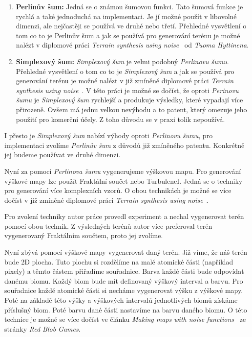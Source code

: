 \begin{enumerate}
    \item \textbf{Perlinův šum:} Jedná se o známou šumovou funkci. Tato šumová funkce je rychlá a také jednoduchá na implementaci. Je jí možné použít v libovolné dimenzi, ale nejčastěji se používá ve druhé nebo třetí. Přehledné vysvětlení o tom co to je Perlinův šum a jak se používá pro generování terénu je možné nalézt v diplomové práci \textit{Terrain synthesis using noise}~\cite{TerrainNoise} od \textit{Tuoma Hyttinena}.

    \item \textbf{Simplexový šum:} \textit{Simplexový šum} je velmi podobný \textit{Perlinovu šumu}. Přehledné vysvětlení o tom co to je \textit{Simplexový šum} a jak se používá pro generování terénu je možné nalézt v již zmíněné diplomové práci \textit{Terrain synthesis using noise}~\cite{TerrainNoise}. V této práci je možné se dočíst, že oproti \textit{Perinovu šumu} je \textit{Simplexový šum} rychlejší a produkuje výsledky, které vypadají více přirozeně. Ovšem má jednu velkou nevýhodu a to patent, který omezuje jeho použití pro komerční účely. Z toho důvodu se v praxi tolik nepoužívá.
\end{enumerate}

I přesto je \textit{Simplexový šum} nabízí výhody oproti \textit{Perlinovu šumu}, pro implementaci zvolíme \textit{Perlinův šum} z důvodů již zmíněného patentu. Konkrétně jej budeme používat ve druhé dimenzi.

Nyní za pomoci \textit{Perlinova šumu} vygenerujeme výškovou mapu. Pro generování výškové mapy lze použít Fraktální součet nebo TurbulencI. Jedná se o techniky pro generování více komplexních vzorů. O obou technikách je možné se více dočíst v již zmíněné diplomové práci \textit{Terrain synthesis using noise}~\cite{TerrainNoise}.

Pro zvolení techniky autor práce provedl experiment a nechal vygenerovat terén pomocí obou technik. Z výsledných terénů autor více preferoval terén vygenerovaný Fraktálním součtem, proto jej zvolíme.

Nyní zbývá pomocí výškové mapy vygenerovat daný terén. Již víme, že náš terén bude 2D plocha. Tuto plochu si rozdělíme na malé atomické části (například pixely) a těmto částem přiřadíme souřadnice. Barva každé části bude odpovídat danému biomu. Každý biom bude mít definovaný výškový interval a barvu. Pro souřadnice každé atomické části si necháme vygenerovat výšku z výškové mapy. Poté na základě této výšky a výškových intervalů jednotlivých biomů získáme příslušný biom. Poté barvu dané části nastavíme na barvu daného biomu. O této technice je možné se více dočíst ve článku \textit{Making maps with noise functions}~\cite{TerrainHeightMap} ze stránky \textit{Red Blob Games}.

